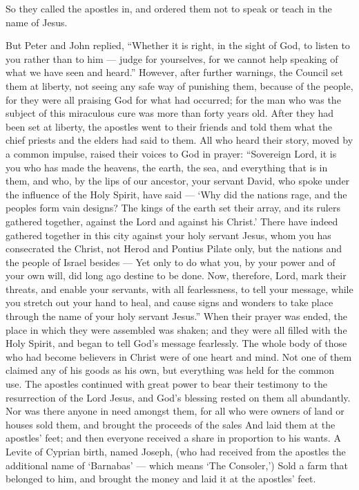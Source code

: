  So they called the apostles in, and ordered them not to
speak or teach in the name of Jesus.

 But Peter and John replied, ``Whether it is right, in the
sight of God, to listen to you rather than to him --- 
judge for yourselves, for we cannot help speaking of what we have seen
and heard.''  However, after further warnings, the Council
set them at liberty, not seeing any safe way of punishing them, because
of the people, for they were all praising God for what had occurred;
 for the man who was the subject of this miraculous cure
was more than forty years old.  After they had been set at
liberty, the apostles went to their friends and told them what the chief
priests and the elders had said to them.  All who heard
their story, moved by a common impulse, raised their voices to God in
prayer: ``Sovereign Lord, it is you who has made the heavens, the earth,
the sea, and everything that is in them,  and who, by the
lips of our ancestor, your servant David, who spoke under the influence
of the Holy Spirit, have said --- `Why did the nations rage, and the
peoples form vain designs?  The kings of the earth set
their array, and its rulers gathered together, against the Lord and
against his Christ.'  There have indeed gathered together
in this city against your holy servant Jesus, whom you has consecrated
the Christ, not Herod and Pontius Pilate only, but the nations and the
people of Israel besides ---  Yet only to do what you, by
your power and of your own will, did long ago destine to be done.
 Now, therefore, Lord, mark their threats, and enable your
servants, with all fearlessness, to tell your message, 
while you stretch out your hand to heal, and cause signs and wonders to
take place through the name of your holy servant Jesus.'' 
When their prayer was ended, the place in which they were assembled was
shaken; and they were all filled with the Holy Spirit, and began to tell
God's message fearlessly.  The whole body of those who had
become believers in Christ were of one heart and mind. Not one of them
claimed any of his goods as his own, but everything was held for the
common use.  The apostles continued with great power to
bear their testimony to the resurrection of the Lord Jesus, and God's
blessing rested on them all abundantly.  Nor was there
anyone in need amongst them, for all who were owners of land or houses
sold them, and brought the proceeds of the sales  And laid
them at the apostles' feet; and then everyone received a share in
proportion to his wants.  A Levite of Cyprian birth, named
Joseph, (who had received from the apostles the additional name of
`Barnabas' --- which means `The Consoler,')  Sold a farm
that belonged to him, and brought the money and laid it at the apostles'
feet.

